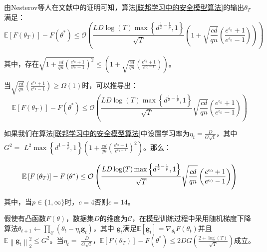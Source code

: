 由Nesterov等人在文献中的证明可知，算法\ref{联邦学习中的安全模型算法}的输出$\theta_{T}$满足：
\begin{equation}\label{eq:模型收敛性证明2}
\mathbb{E}\left[F\left(\theta_{T}\right)\right]-F\left(\theta^{*}\right) \leq \mathcal{O}\left(\frac{L D \log (T) \max \left\{d^{\frac{1}{2}-\frac{1}{p}}, 1\right\}}{\sqrt{T}}\left(1+\sqrt{\frac{c d}{q n}}\left(\frac{e^{\epsilon_{0}}+1}{e^{\epsilon_{0}}-1}\right)\right)\right)
\end{equation}

其中，存在$\sqrt{1+\frac{c d}{q n}\left(\frac{e^{\epsilon_{0}}+1}{e^{\epsilon_{0}}-1}\right)^{2}} \leq\left(1+\sqrt{\frac{c d}{q n}}\left(\frac{e^{\epsilon_{0}}+1}{e^{\epsilon_{0}-1}}\right)\right)$。

当$\sqrt{\frac{c d}{q n}}\left(\frac{e^{\epsilon_{0}}+1}{e^{\epsilon_{0}}-1}\right) \geq \Omega(1)$时，可以推导出：
\begin{equation}\label{eq:模型收敛性证明3}
\mathbb{E}\left[F\left(\theta_{T}\right)\right]-F\left(\theta^{*}\right) \leq \mathcal{O}\left(\frac{L D \log (T) \max \left\{d^{\frac{1}{2}-\frac{1}{p}}, 1\right\}}{\sqrt{T}} \sqrt{\frac{c d}{q n}}\left(\frac{e^{\epsilon_{0}}+1}{e^{\epsilon_{0}}-1}\right)\right)
\end{equation}

如果我们在算法\ref{联邦学习中的安全模型算法}中设置学习率为$\eta_{t}=\frac{D}{G \sqrt{t}}$，其中\\$G^{2}=$ $L^{2} \max \left\{d^{1-\frac{2}{p}}, 1\right\}\left(1+\frac{c d}{q n}\left(\frac{e^{\epsilon_{0}}+1}{e^{\epsilon_{0}-1}}\right)^{2}\right)$。那么：

\begin{equation}\label{eq:模型收敛性证明4}
\mathbb{E}\left[F\left(\theta_{T}\right)\right]-F\left(\theta^{*}\right) \leq \\
\mathcal{O}\left(\frac{L D \log (T) \max \left\{d^{\frac{1}{2}-\frac{1}{p}}, 1\right\}}{\sqrt{T}} \sqrt{\frac{c d}{q n}}\left(\frac{e^{\epsilon_{0}}+1}{e^{\epsilon_{0}}-1}\right)\right)
\end{equation}

其中，当$p \in\{1, \infty\}$时，$c=4$否则$c=14$。

\begin{theorem}[随机梯度下降算法的收敛性]\label{随机梯度下降算法的收敛性}
假使有凸函数$F(\theta)$，数据集$D$的维度为$\mathcal{C}$，在模型训练过程中采用随机梯度下降算法$\theta_{t+1} \leftarrow \prod_{\mathcal{C}}\left(\theta_{t}-\eta_{t} \mathbf{g}_{t}\right)$，其中 $\mathbf{g}_{t}$满足$\mathbb{E}\left[\mathbf{g}_{t}\right]=\nabla_{\theta_{t}} F\left(\theta_{t}\right)$并且$\mathbb{E}\left\|\mathbf{g}_{t}\right\|_{2}^{2} \leq G^{2}$。当$\eta_{t}=$ $\frac{D}{G \sqrt{t}}$，$\mathbb{E}\left[F\left(\theta_{T}\right)\right]-F\left(\theta^{*}\right) \leq 2 D G\left(\frac{2+\log (T)}{\sqrt{T}}\right)$成立。
\end{theorem}

